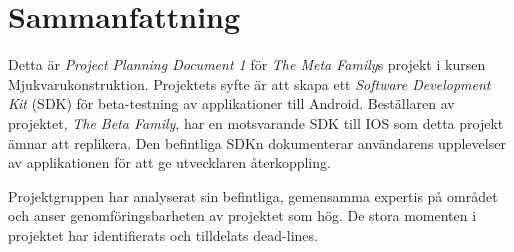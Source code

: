 \section*{Sammanfattning} %
Detta är \textit{Project Planning Document 1} för \textit{The Meta Family}s projekt i kursen Mjukvarukonstruktion. Projektets syfte är att skapa ett \textit{Software Development Kit} (SDK) för beta-testning av applikationer till Android. Beställaren av projektet, \textit{The Beta Family}, har en motsvarande SDK till IOS som detta projekt ämnar att replikera. Den befintliga SDKn dokumenterar användarens upplevelser av applikationen för att ge utvecklaren återkoppling.

Projektgruppen har analyserat sin befintliga, gemensamma expertis på området och anser genomföringsbarheten av projektet som hög. De stora momenten i projektet har identifierats och tilldelats dead-lines.
